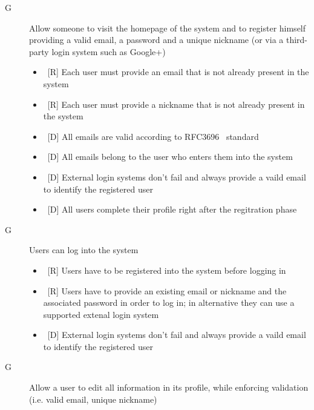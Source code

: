 \setcounter{countReq}{1}

\begin{description}
\item[G\thecountReq] Allow someone to visit the homepage of the system and to register himself providing a valid email, a password and a unique nickname (or via a third-party login system such as Google+)

\begin{itemize}
\item~[R] Each user must provide an email that is not already present in the system
\item~[R] Each user must provide a nickname that is not already present in the system
\end{itemize}

\begin{itemize}
\item~[D] All emails are valid according to RFC3696~\cite{RFC3696} standard
\item~[D] All emails belong to the user who enters them into the system
\item~[D] External login systems don’t fail and always provide a vaild email to identify the registered user
\item~[D] All users complete their profile right after the regitration phase
\end{itemize}

\item[G\thecountReq] Users can log into the system

\begin{itemize}
\item~[R] Users have to be registered into the system before logging in
\item~[R] Users have to provide an existing email or nickname and the associated password in order to log in; in alternative they can use a supported extenal login system
\end{itemize}

\begin{itemize}
\item~[D] External login systems don’t fail and always provide a vaild email to identify the registered user
\end{itemize}

\item[G\thecountReq] Allow a user to edit all information in its profile, while enforcing validation (i.e. valid email, unique nickname)


\end{description}
